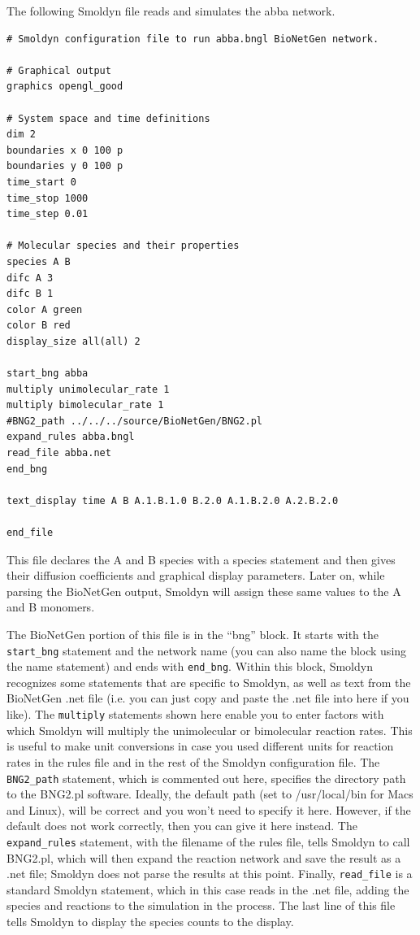 \documentclass {book}
\newcommand {\ttt} {\texttt}
\begin{document}
The following Smoldyn file reads and simulates the abba network.

\begin{lstlisting}[style=SSAC]
# Smoldyn configuration file to run abba.bngl BioNetGen network.

# Graphical output
graphics opengl_good

# System space and time definitions
dim 2
boundaries x 0 100 p
boundaries y 0 100 p
time_start 0
time_stop 1000
time_step 0.01

# Molecular species and their properties
species A B
difc A 3
difc B 1
color A green
color B red
display_size all(all) 2

start_bng abba
multiply unimolecular_rate 1
multiply bimolecular_rate 1
#BNG2_path ../../../source/BioNetGen/BNG2.pl
expand_rules abba.bngl
read_file abba.net
end_bng

text_display time A B A.1.B.1.0 B.2.0 A.1.B.2.0 A.2.B.2.0

end_file
\end{lstlisting}

This file declares the A and B species with a species statement and then gives their diffusion coefficients and graphical display parameters. Later on, while parsing the BioNetGen output, Smoldyn will assign these same values to the A and B monomers.

The BioNetGen portion of this file is in the ``bng'' block. It starts with the \ttt{start\_bng} statement and the network name (you can also name the block using the name statement) and ends with \ttt{end\_bng}. Within this block, Smoldyn recognizes some statements that are specific to Smoldyn, as well as text from the BioNetGen .net file (i.e. you can just copy and paste the .net file into here if you like). The \ttt{multiply} statements shown here enable you to enter factors with which Smoldyn will multiply the unimolecular or bimolecular reaction rates. This is useful to make unit conversions in case you used different units for reaction rates in the rules file and in the rest of the Smoldyn configuration file. The \ttt{BNG2\_path} statement, which is commented out here, specifies the directory path to the BNG2.pl software. Ideally, the default path (set to /usr/local/bin for Macs and Linux), will be correct and you won't need to specify it here. However, if the default does not work correctly, then you can give it here instead. The \ttt{expand\_rules} statement, with the filename of the rules file, tells Smoldyn to call BNG2.pl, which will then expand the reaction network and save the result as a .net file; Smoldyn does not parse the results at this point. Finally, \ttt{read\_file} is a standard Smoldyn statement, which in this case reads in the .net file, adding the species and reactions to the simulation in the process. The last line of this file tells Smoldyn to display the species counts to the display.
\end{document}
